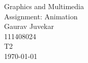 \documentclass[a4paper,14pt,english,crop=false]{standalone}
\begin{document}
\begin{titlepage}
\begin{center}
  {Graphics and Multimedia \\}
  \LARGE{Assignment: Animation \\}
  \horrule{0.4pt}
  \large{Gaurav Juvekar \\}
  \large{111408024 \\}
  \large{T2 \\}
  \normalsize{\today{}}
\end{center}
\horrule{1pt}
\end{titlepage}
\end{document}
